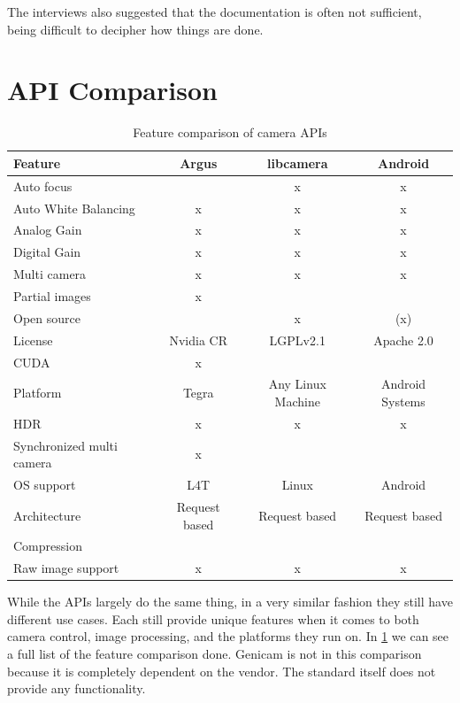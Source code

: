 The interviews also suggested that the documentation is often not sufficient,
being difficult to decipher how things are done.

\section{API Comparison}\label{section:comparison}
\begin{table}[h]
    \centering
    \begin{tabular}{|l|c|c|c|}
        \hline
        \textbf{Feature} & \textbf{Argus} & \textbf{libcamera} & \textbf{Android} \\ \hline
        Auto focus &  & x & x \\ \hline
        Auto White Balancing & x & x & x \\ \hline
        Analog Gain & x & x & x \\ \hline
        Digital Gain & x & x & x \\ \hline
        Multi camera & x & x & x \\ \hline
        Partial images & x &  &  \\ \hline
        Open source &  & x & (x) \\ \hline
        License & Nvidia CR & LGPLv2.1 & Apache 2.0 \\ \hline
        CUDA & x &  &  \\ \hline
        Platform & Tegra & Any Linux Machine & Android Systems \\ \hline
        HDR & x & x & x \\ \hline
        Synchronized multi camera & x &  &  \\ \hline
        OS support & L4T & Linux & Android \\ \hline
        Architecture & Request based & Request based & Request based \\ \hline
        Compression &  &  &  \\ \hline
        Raw image support & x & x & x \\ \hline
    \end{tabular}
    \caption{Feature comparison of camera APIs}
    \label{table:apiComparison}
\end{table}

While the APIs largely do the same thing, in a very similar fashion they still
have different use cases. Each still provide unique features when it comes to
both camera control, image processing, and the platforms they run on. In
\cref{table:apiComparison} we can see a full list of the feature comparison
done. Genicam is not in this comparison because it is completely dependent on
the vendor. The standard itself does not provide any functionality.

